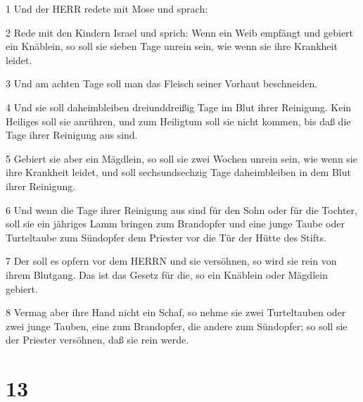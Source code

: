 \par 1 Und der HERR redete mit Mose und sprach:
\par 2 Rede mit den Kindern Israel und sprich: Wenn ein Weib empfängt und gebiert ein Knäblein, so soll sie sieben Tage unrein sein, wie wenn sie ihre Krankheit leidet.
\par 3 Und am achten Tage soll man das Fleisch seiner Vorhaut beschneiden.
\par 4 Und sie soll daheimbleiben dreiunddreißig Tage im Blut ihrer Reinigung. Kein Heiliges soll sie anrühren, und zum Heiligtum soll sie nicht kommen, bis daß die Tage ihrer Reinigung aus sind.
\par 5 Gebiert sie aber ein Mägdlein, so soll sie zwei Wochen unrein sein, wie wenn sie ihre Krankheit leidet, und soll sechsundsechzig Tage daheimbleiben in dem Blut ihrer Reinigung.
\par 6 Und wenn die Tage ihrer Reinigung aus sind für den Sohn oder für die Tochter, soll sie ein jähriges Lamm bringen zum Brandopfer und eine junge Taube oder Turteltaube zum Sündopfer dem Priester vor die Tür der Hütte des Stifts.
\par 7 Der soll es opfern vor dem HERRN und sie versöhnen, so wird sie rein von ihrem Blutgang. Das ist das Gesetz für die, so ein Knäblein oder Mägdlein gebiert.
\par 8 Vermag aber ihre Hand nicht ein Schaf, so nehme sie zwei Turteltauben oder zwei junge Tauben, eine zum Brandopfer, die andere zum Sündopfer; so soll sie der Priester versöhnen, daß sie rein werde.

\chapter{13}

